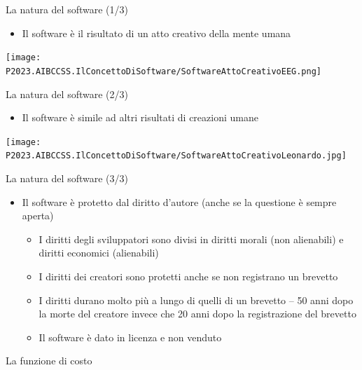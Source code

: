 \documentclass{beamer}
\begin{document}
\begin{frame}
{\centerline{La natura del software (1/3)}}
\begin{itemize}
    \item Il software \`{e} il risultato di un atto creativo della mente umana
\end{itemize} 
\vspace{0.8cm}
\begin{center}
    \texttt{[image: P2023.AIBCCSS.IlConcettoDiSoftware/SoftwareAttoCreativoEEG.png]}
\end{center}

\end{frame}

\begin{frame}
{\centerline{La natura del software (2/3)}}
\begin{itemize}
    \item Il software \`{e} simile ad altri risultati di creazioni umane
\end{itemize} 
\begin{center}
    \texttt{[image: P2023.AIBCCSS.IlConcettoDiSoftware/SoftwareAttoCreativoLeonardo.jpg]}
\end{center}

\end{frame}

\begin{frame}
{\centerline{La natura del software (3/3)}}
\begin{itemize}
    \item Il software \`{e} protetto dal diritto d'autore (anche se la questione \`{e} sempre aperta)
\begin{itemize}
    \item I diritti degli sviluppatori sono divisi in diritti morali (non alienabili) e diritti economici (alienabili)
    \item I diritti dei creatori sono protetti anche se non registrano un brevetto 
    \item I diritti durano molto pi\`{u} a lungo di quelli di un brevetto -- 50 anni dopo la morte del creatore invece che 20 anni dopo la registrazione del brevetto 
    \item Il software \`{e} dato in licenza e non venduto
\end{itemize} 
\end{itemize} 

\end{frame}

\begin{frame}
{\centerline{La funzione di costo}}
\begin{center}
    
\end{center}

\end{frame}
\end{document}
